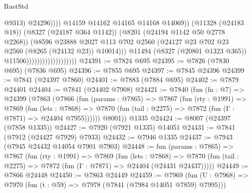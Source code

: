 \begin{lexlean}{RustStd}
\begin{coremodule}
                                                          @9313)
                                                        @24296))))
                                                @14159
                                                @14162
                                                @14165
                                                @14168
                                                @14069))
                                            (@11328 (@24183 @18))
                                            (@8327 (@24187 @364 @1142))
                                            (@8201 (@24194 @1142 @50 @2778 @2268))
                                            (@8596
                                              @23888
                                              @2027
                                              @113
                                              @702
                                              @2560
                                              (@24127
                                                @23
                                                @702
                                                @23
                                                @2560
                                                (@8265 (@24132 @23))
                                                @10014)))
                                          @11494
                                          (@8327 (@20801 @1323 @365))
                                          @11506)))))))))))))))))))
@24391 := @7824 @695
@24395 := @7826 (@7830 @695) (@7836 @695)
@24396 := @7855 @695
@24397 := @7845 @24396
@24399 := @7841 (@24397 @7860)
@24401 := @7883 (@7884 @695)
@24402 := @7879 @24401
@24404 := @7841 (@24402 @7908)
@24421 := @7840
    (fun (fn : @7) =>
    @24399
      (@7863
        (@7866
          (fun (params : @7865) =>
          @7867
            (fun (rty : @1991) =>
            @7869
              (fun (lets : @7868) =>
              @7870 (fun (tail : @2275) => @7872 (fun (Γ : @7871) => @24404 @7955))))))
        @8001))
    @1335
@24424 := @8007 (@24397 (@7858 @1335))
@24427 := @7920 (@7921 @1335) @14051
@24431 := @7841 (@7912 (@24427 @7929) @7933)
@24432 := @7946 @1335
@24437 := @7943 (@7945 @24432 @14054 @7901 @7903)
@24448 := fun (params : @7865) =>
  @7867
    (fun (rty : @1991) =>
    @7869
      (fun (lets : @7868) =>
      @7870 (fun (tail : @2275) => @7872 (fun (Γ : @7871) => @24404 (@24431 @24437)))))
@24449 := @7866 @24448
@24450 := @7863 @24449
@24459 := @7969
    (fun (U : @7968) => @7970 (fun (t : @59) => @7978 (@7841 (@7984 @14051 @7859) @7995)))

\end{coremodule}
\end{lexlean}
